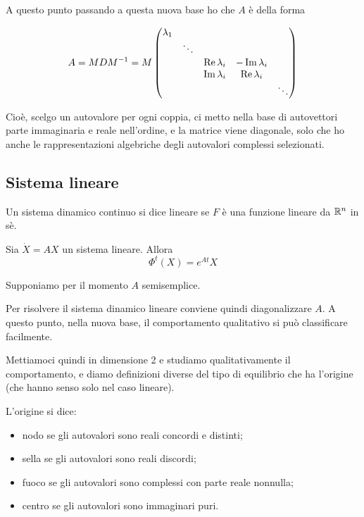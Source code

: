 \documentclass[a4paper,10pt,oneside]{math_article}
\renewcommand{\Re}{\operatorname{Re}}
\renewcommand{\Im}{\operatorname{Im}}
\begin{document}
		A questo punto passando a questa nuova base ho che $A$ è della forma
		
		\[
			A= MDM\inv = M \begin{pmatrix}
		                 \lambda_1 \\
		                 & \ddots \\
		                 && \Re{\lambda_i} & -\Im{\lambda_i} \\
		                 && \Im{\lambda_i} & \Re{\lambda_i} \\
		                 &&&& \ddots
		                \end{pmatrix}
		\]
		
		Cioè, scelgo un autovalore per ogni coppia, ci metto nella base di autovettori parte immaginaria e reale nell'ordine, e la matrice viene diagonale, solo che ho anche le rappresentazioni algebriche degli autovalori complessi selezionati.
		
		
		

		
		

	
	
	\subsection{Sistema lineare}
		\begin{mydef}
			Un sistema dinamico continuo si dice lineare se $F$ è una funzione lineare da $\mathbb R^n$ in sè.
		\end{mydef}
		
		\begin{myprop}
			Sia $\dot X = AX$ un sistema lineare. Allora 
			\[
				\Phi^t(X) = e^{At}X
			\]
		\end{myprop}
		
		Supponiamo per il momento $A$ semisemplice.
		
		Per risolvere il sistema dinamico lineare conviene quindi diagonalizzare $A$. A questo punto, nella nuova base, il comportamento qualitativo si può classificare facilmente.
		
		Mettiamoci quindi in dimensione 2 e studiamo qualitativamente il comportamento, e diamo definizioni diverse del tipo di equilibrio che ha l'origine (che hanno senso solo nel caso lineare).
		\begin{mydef}
		L'origine si dice:
		\begin{itemize}
		 \item nodo se gli autovalori sono reali concordi e distinti;
		 \item sella se gli autovalori sono reali discordi;
		 \item fuoco se gli autovalori sono complessi con parte reale nonnulla;
		 \item centro se gli autovalori sono immaginari puri.
		\end{itemize}
		\end{mydef}

		
		
	







 
\end{document}
